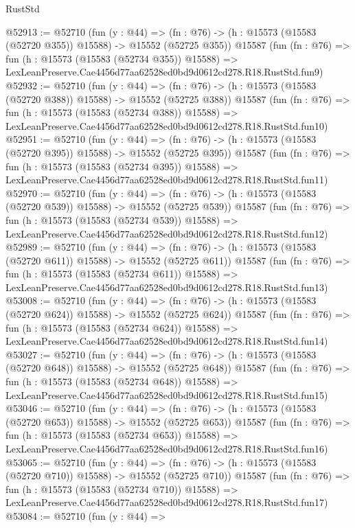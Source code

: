 \begin{lexlean}{RustStd}
\begin{coremodule}
@52913 := @52710
    (fun (y : @44) =>
    (fn : @76) -> (h : @15573 (@15583 (@52720 @355)) @15588) -> @15552 (@52725 @355))
    @15587
    (fun (fn : @76) =>
    fun (h : @15573 (@15583 (@52734 @355)) @15588) =>
    LexLeanPreserve.Cae4456d77aa62528ed0bd9d0612cd278.R18.RustStd.fun9)
@52932 := @52710
    (fun (y : @44) =>
    (fn : @76) -> (h : @15573 (@15583 (@52720 @388)) @15588) -> @15552 (@52725 @388))
    @15587
    (fun (fn : @76) =>
    fun (h : @15573 (@15583 (@52734 @388)) @15588) =>
    LexLeanPreserve.Cae4456d77aa62528ed0bd9d0612cd278.R18.RustStd.fun10)
@52951 := @52710
    (fun (y : @44) =>
    (fn : @76) -> (h : @15573 (@15583 (@52720 @395)) @15588) -> @15552 (@52725 @395))
    @15587
    (fun (fn : @76) =>
    fun (h : @15573 (@15583 (@52734 @395)) @15588) =>
    LexLeanPreserve.Cae4456d77aa62528ed0bd9d0612cd278.R18.RustStd.fun11)
@52970 := @52710
    (fun (y : @44) =>
    (fn : @76) -> (h : @15573 (@15583 (@52720 @539)) @15588) -> @15552 (@52725 @539))
    @15587
    (fun (fn : @76) =>
    fun (h : @15573 (@15583 (@52734 @539)) @15588) =>
    LexLeanPreserve.Cae4456d77aa62528ed0bd9d0612cd278.R18.RustStd.fun12)
@52989 := @52710
    (fun (y : @44) =>
    (fn : @76) -> (h : @15573 (@15583 (@52720 @611)) @15588) -> @15552 (@52725 @611))
    @15587
    (fun (fn : @76) =>
    fun (h : @15573 (@15583 (@52734 @611)) @15588) =>
    LexLeanPreserve.Cae4456d77aa62528ed0bd9d0612cd278.R18.RustStd.fun13)
@53008 := @52710
    (fun (y : @44) =>
    (fn : @76) -> (h : @15573 (@15583 (@52720 @624)) @15588) -> @15552 (@52725 @624))
    @15587
    (fun (fn : @76) =>
    fun (h : @15573 (@15583 (@52734 @624)) @15588) =>
    LexLeanPreserve.Cae4456d77aa62528ed0bd9d0612cd278.R18.RustStd.fun14)
@53027 := @52710
    (fun (y : @44) =>
    (fn : @76) -> (h : @15573 (@15583 (@52720 @648)) @15588) -> @15552 (@52725 @648))
    @15587
    (fun (fn : @76) =>
    fun (h : @15573 (@15583 (@52734 @648)) @15588) =>
    LexLeanPreserve.Cae4456d77aa62528ed0bd9d0612cd278.R18.RustStd.fun15)
@53046 := @52710
    (fun (y : @44) =>
    (fn : @76) -> (h : @15573 (@15583 (@52720 @653)) @15588) -> @15552 (@52725 @653))
    @15587
    (fun (fn : @76) =>
    fun (h : @15573 (@15583 (@52734 @653)) @15588) =>
    LexLeanPreserve.Cae4456d77aa62528ed0bd9d0612cd278.R18.RustStd.fun16)
@53065 := @52710
    (fun (y : @44) =>
    (fn : @76) -> (h : @15573 (@15583 (@52720 @710)) @15588) -> @15552 (@52725 @710))
    @15587
    (fun (fn : @76) =>
    fun (h : @15573 (@15583 (@52734 @710)) @15588) =>
    LexLeanPreserve.Cae4456d77aa62528ed0bd9d0612cd278.R18.RustStd.fun17)
@53084 := @52710
    (fun (y : @44) =>

\end{coremodule}
\end{lexlean}
